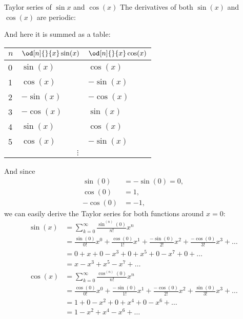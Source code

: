\begin{example}{Taylor series of $\sin{x}$ and $\cos(x)$}{}
	The derivatives of both $\sin(x)$ and $\cos(x)$ are periodic:

	\begin{center}
	\end{center}

	And here it is summed as a table:

	\begin{center}
		\begin{tabular}{lll}
			\toprule
			$n$ & $\od[n]{}{x}\sin(x)$ & $\od[n]{}{x}\cos(x)$\\
			\midrule
			0 & $\sin(x)$  & $\cos(x)$  \\
			1 & $\cos(x)$  & $-\sin(x)$ \\
			2 & $-\sin(x)$ & $-\cos(x)$ \\
			3 & $-\cos(x)$ & $\sin(x)$  \\
			4 & $\sin(x)$  & $\cos(x)$  \\
			5 & $\cos(x)$  & $-\sin(x)$ \\
			\multicolumn{3}{c}{$\vdots$}\\
			\bottomrule
		\end{tabular}
	\end{center}

	And since
	\[
		\begin{aligned}
			\sin(0) &= -\sin(0) = 0,\\
			\cos(0) &= 1,\\
			-\cos(0) &= -1,
		\end{aligned}
	\]
	we can easily derive the Taylor series for both functions around $x=0$:
	\[
		\begin{aligned}
			\sin(x) &= \sum\limits_{k=0}^{\infty}\frac{\sin^{(n)}(0)}{n!}x^{n}\\
					&= \frac{\sin(0)}{0!}x^{0} + \frac{\cos(0)}{1!}x^{1} + \frac{-\sin(0)}{2!}x^{2} + \frac{-\cos(0)}{3!}x^{3} + \dots\\
					&= 0 + x + 0 -x^{3} + 0 + x^{5} + 0 - x^{7} + 0 + \dots\\
					&= x -x^{3} + x^{5} - x^{7} + \dots\\
			\cos(x) &= \sum\limits_{k=0}^{\infty}\frac{\cos^{(n)}(0)}{n!}x^{n}\\
					&= \frac{\cos(0)}{0!}x^{0} + \frac{-\sin(0)}{1!}x^{1} + \frac{-\cos(0)}{2!}x^{2} + \frac{\sin(0)}{3!}x^{3} + \dots\\
					&= 1 + 0 - x^{2} + 0 + x^{4} + 0 - x^{6} + \dots\\
					&= 1 - x^{2} + x^{4} - x^{6} + \dots
		\end{aligned}
	\]
\end{example}

